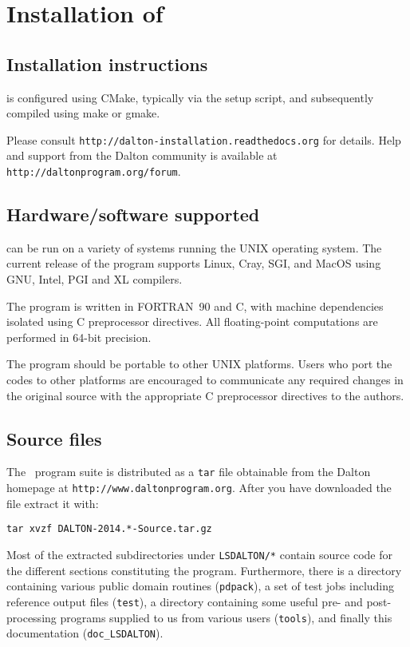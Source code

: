 \chapter{Installation of \lsdalton}\label{ch:install}

\section{Installation instructions}

{\lsdalton} is configured using CMake, typically via the setup script,
and subsequently compiled using make or gmake.

Please consult \verb|http://dalton-installation.readthedocs.org| for details.
Help and support from the Dalton community is available at \verb|http://daltonprogram.org/forum|.

\section{Hardware/software supported}
{\lsdalton} can be run on a variety of systems running the UNIX operating system.
The current release of the program supports Linux, Cray, SGI,
and MacOS using GNU, Intel, PGI and XL compilers.

The program is written in FORTRAN~90 and C, with machine dependencies
isolated using C preprocessor directives.  All
floating-point computations are performed in 64-bit precision.

The program should be portable to other UNIX platforms.  Users
who port the codes to other platforms are encouraged to communicate any
required changes in the original source with the appropriate C preprocessor
directives to the authors.

\section{Source files}\label{sec:source}

The \latestrelease\ program suite is distributed as a \verb|tar|
file obtainable from
the Dalton homepage at \verb|http://www.daltonprogram.org|.
After you have downloaded the file extract it with:
\begin{verbatim}
tar xvzf DALTON-2014.*-Source.tar.gz
\end{verbatim}
Most of the extracted subdirectories under \verb|LSDALTON/*| contain source code for the different
sections constituting the {\lsdalton} program.
Furthermore, there is a directory containing various public domain routines (\verb|pdpack|), a set of test jobs including reference output files (\verb|test|), a directory
containing some useful pre- and post-processing programs supplied to us from
various users (\verb|tools|), and finally this documentation (\verb|doc_LSDALTON|). 

